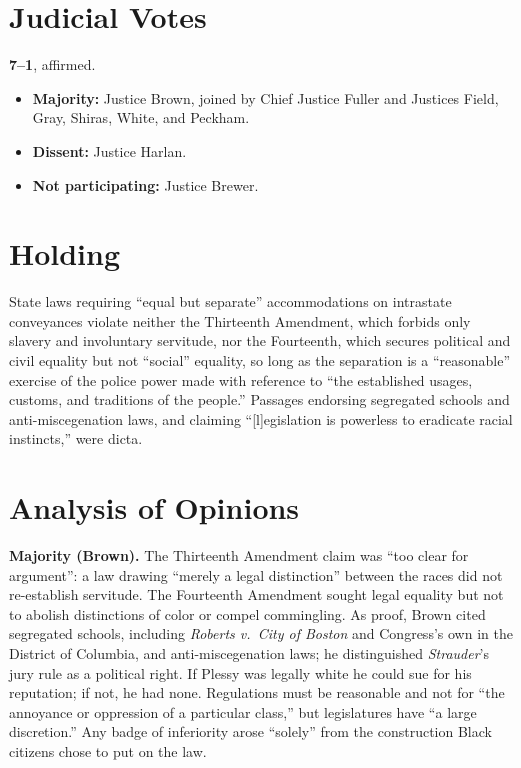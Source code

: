 \documentclass[12pt]{article}
\begin{document}
\section{Judicial Votes}

\textbf{7--1}, affirmed.
\begin{itemize}
\item \textbf{Majority:} Justice Brown, joined by Chief Justice Fuller and Justices Field, Gray, Shiras, White, and Peckham.
\item \textbf{Dissent:} Justice Harlan.
\item \textbf{Not participating:} Justice Brewer.
\end{itemize}

\section{Holding}

State laws requiring ``equal but separate'' accommodations on intrastate conveyances violate neither the Thirteenth Amendment, which forbids only slavery and involuntary servitude, nor the Fourteenth, which secures political and civil equality but not ``social'' equality, so long as the separation is a ``reasonable'' exercise of the police power made with reference to ``the established usages, customs, and traditions of the people.'' Passages endorsing segregated schools and anti-miscegenation laws, and claiming ``[l]egislation is powerless to eradicate racial instincts,'' were dicta.

\section{Analysis of Opinions}

\textbf{Majority (Brown).} The Thirteenth Amendment claim was ``too clear for argument'': a law drawing ``merely a legal distinction'' between the races did not re-establish servitude. The Fourteenth Amendment sought legal equality but not to abolish distinctions of color or compel commingling. As proof, Brown cited segregated schools, including \textit{Roberts v.\ City of Boston} and Congress's own in the District of Columbia, and anti-miscegenation laws; he distinguished \textit{Strauder}'s jury rule as a political right. If Plessy was legally white he could sue for his reputation; if not, he had none. Regulations must be reasonable and not for ``the annoyance or oppression of a particular class,'' but legislatures have ``a large discretion.'' Any badge of inferiority arose ``solely'' from the construction Black citizens chose to put on the law.
\end{document}
